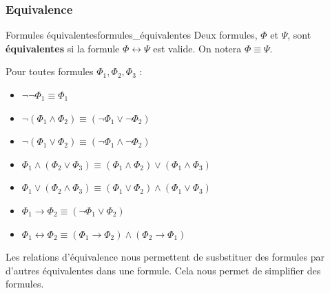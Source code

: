 \subsubsection{Equivalence}

\begin{definition}{Formules équivalentes}{formules_équivalentes}
Deux formules, $\Phi$ et $\Psi$, sont \textbf{équivalentes} si la formule $\Phi\leftrightarrow\Psi$ est valide. On notera $\Phi\equiv\Psi$.
\end{definition}
Pour toutes formules $\Phi_1,\Phi_2,\Phi_3$ :
\begin{itemize}[label=$\bullet$]
  \item $\neg\neg\Phi_1\equiv\Phi_1$
  \item $\neg(\Phi_1\land\Phi_2)\equiv(\neg\Phi_1\lor\neg\Phi_2)$
  \item $\neg(\Phi_1\lor\Phi_2)\equiv(\neg\Phi_1\land\neg\Phi_2)$
  \item $\Phi_1\land(\Phi_2\lor\Phi_3)\equiv(\Phi_1\land\Phi_2)\lor(\Phi_1\land\Phi_3)$
  \item $\Phi_1\lor(\Phi_2\land\Phi_3)\equiv(\Phi_1\lor\Phi_2)\land(\Phi_1\lor\Phi_3)$
  \item $\Phi_1\rightarrow\Phi_2\equiv(\neg\Phi_1\lor\Phi_2)$
  \item $\Phi_1\leftrightarrow\Phi_2\equiv(\Phi_1\rightarrow\Phi_2)\land(\Phi_2\rightarrow\Phi_1)$
\end{itemize}

\newpage
Les relations d'équivalence nous permettent de susbstituer des formules par d'autres équivalentes dans une formule.
Cela nous permet de simplifier des formules.

